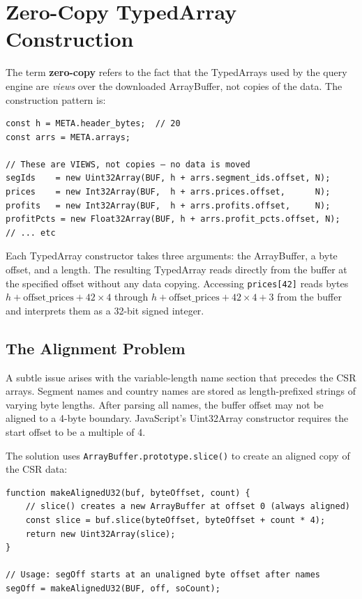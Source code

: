 \documentclass[11pt,a4paper,twoside]{book}
\begin{document}
\section{Zero-Copy TypedArray Construction}

The term \textbf{zero-copy} refers to the fact that the TypedArrays used by the query engine
are \textit{views} over the downloaded ArrayBuffer, not copies of the data. The construction
pattern is:

\begin{lstlisting}[style=js,caption={Zero-copy TypedArray construction from an ArrayBuffer.}]
const h = META.header_bytes;  // 20
const arrs = META.arrays;

// These are VIEWS, not copies — no data is moved
segIds    = new Uint32Array(BUF, h + arrs.segment_ids.offset, N);
prices    = new Int32Array(BUF,  h + arrs.prices.offset,      N);
profits   = new Int32Array(BUF,  h + arrs.profits.offset,     N);
profitPcts = new Float32Array(BUF, h + arrs.profit_pcts.offset, N);
// ... etc
\end{lstlisting}

Each TypedArray constructor takes three arguments: the ArrayBuffer, a byte offset, and a
length. The resulting TypedArray reads directly from the buffer at the specified offset
without any data copying. Accessing \texttt{prices[42]} reads bytes
$h + \text{offset\_prices} + 42 \times 4$ through $h + \text{offset\_prices} + 42 \times 4 + 3$
from the buffer and interprets them as a 32-bit signed integer.

\subsection{The Alignment Problem}

A subtle issue arises with the variable-length name section that precedes the CSR arrays.
Segment names and country names are stored as length-prefixed strings of varying byte lengths.
After parsing all names, the buffer offset may not be aligned to a 4-byte boundary. JavaScript's
Uint32Array constructor requires the start offset to be a multiple of 4.

The solution uses \texttt{ArrayBuffer.prototype.slice()} to create an aligned copy of the
CSR data:

\begin{lstlisting}[style=js,caption={Creating aligned Uint32Arrays from unaligned buffer offsets.}]
function makeAlignedU32(buf, byteOffset, count) {
    // slice() creates a new ArrayBuffer at offset 0 (always aligned)
    const slice = buf.slice(byteOffset, byteOffset + count * 4);
    return new Uint32Array(slice);
}

// Usage: segOff starts at an unaligned byte offset after names
segOff = makeAlignedU32(BUF, off, soCount);
\end{lstlisting}
\end{document}
